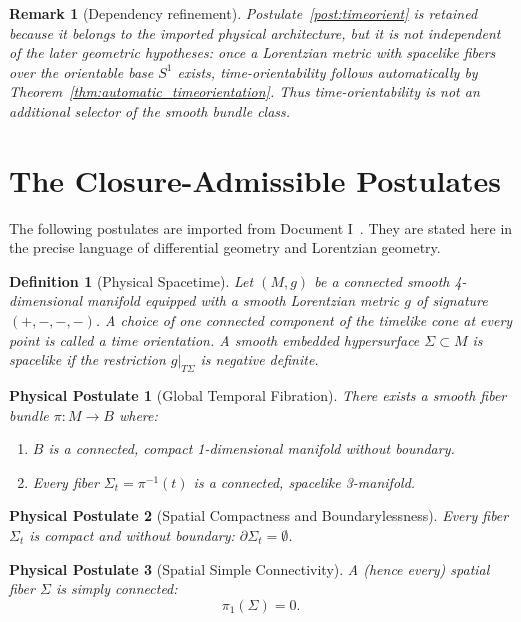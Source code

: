 \documentclass[11pt]{article}
\theoremstyle{canonmath}
\newtheorem{definition}[theorem]{Definition}
\newtheorem{remark}[theorem]{Remark}
\theoremstyle{canonpostulate}
\newtheorem{postulate}{Physical Postulate}[section]
\theoremstyle{canonproposition}
\providecommand{\M}{\mathcal{M}}
\providecommand{\Sone}{S^1}
\def\mathcal#1{#1}%
\begin{document}
\begin{remark}[Dependency refinement]
Postulate~\ref{post:timeorient} is retained because it belongs to the imported physical architecture, but it is not independent of the later geometric hypotheses: once a Lorentzian metric with spacelike fibers over the orientable base $\Sone$ exists, time-orientability follows automatically by Theorem~\ref{thm:automatic_timeorientation}. Thus time-orientability is not an additional selector of the smooth bundle class.
\end{remark}

\section{The Closure-Admissible Postulates}

The following postulates are imported from Document I~\cite{CanonWhy}. They are stated here in the precise language of differential geometry and Lorentzian geometry.

\begin{definition}[Physical Spacetime]
Let $(\M,g)$ be a connected smooth 4-dimensional manifold equipped with a smooth Lorentzian metric $g$ of signature $(+,-,-,-)$. A choice of one connected component of the timelike cone at every point is called a \emph{time orientation}. A smooth embedded hypersurface $\Sigma\subset\M$ is \emph{spacelike} if the restriction $g|_{T\Sigma}$ is negative definite.
\end{definition}

\begin{postulate}[Global Temporal Fibration] \label{post:fibration}
There exists a smooth fiber bundle $\pi: \M \to B$ where:
\begin{enumerate}
    \item $B$ is a connected, compact 1-dimensional manifold without boundary.
    \item Every fiber $\Sigma_t = \pi^{-1}(t)$ is a connected, spacelike 3-manifold.
\end{enumerate}
\end{postulate}

\begin{postulate}[Spatial Compactness and Boundarylessness] \label{post:compact}
Every fiber $\Sigma_t$ is compact and without boundary: $\partial \Sigma_t = \emptyset$.
\end{postulate}

\begin{postulate}[Spatial Simple Connectivity] \label{post:simple}
A (hence every) spatial fiber $\Sigma$ is simply connected:
\[
\pi_1(\Sigma)=0.
\]
\end{postulate}
\end{document}
